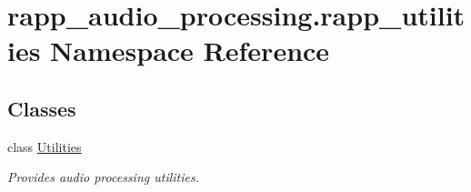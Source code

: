 \hypertarget{namespacerapp__audio__processing_1_1rapp__utilities}{\section{rapp\-\_\-audio\-\_\-processing.\-rapp\-\_\-utilities Namespace Reference}
\label{namespacerapp__audio__processing_1_1rapp__utilities}
}
\subsection*{Classes}
\begin{DoxyCompactItemize}
\item 
class \hyperlink{classrapp__audio__processing_1_1rapp__utilities_1_1Utilities}{Utilities}
\begin{DoxyCompactList}\small\item\em Provides audio processing utilities. \end{DoxyCompactList}\end{DoxyCompactItemize}
